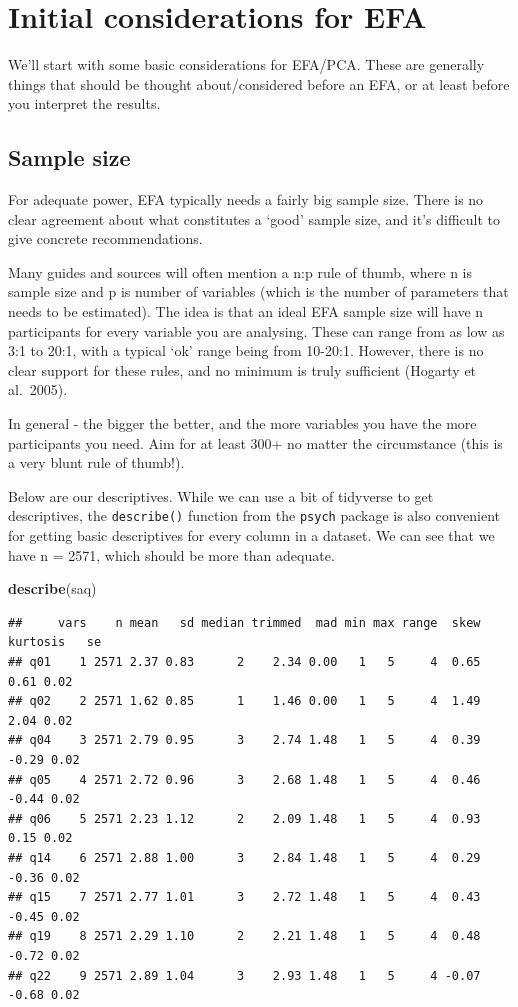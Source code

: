 \documentclass[
]{book}
\newenvironment{Shaded}{\begin{snugshade}}{\end{snugshade}}
\newcommand{\FunctionTok}[1]{\textcolor[rgb]{0.13,0.29,0.53}{\textbf{#1}}}
\newcommand{\NormalTok}[1]{#1}
\begin{document}
\section{Initial considerations for EFA}\label{initial-considerations-for-efa}

We'll start with some basic considerations for EFA/PCA. These are generally things that should be thought about/considered before an EFA, or at least before you interpret the results.

\subsection{Sample size}\label{sample-size}

For adequate power, EFA typically needs a fairly big sample size. There is no clear agreement about what constitutes a `good' sample size, and it's difficult to give concrete recommendations.

Many guides and sources will often mention a n:p rule of thumb, where n is sample size and p is number of variables (which is the number of parameters that needs to be estimated). The idea is that an ideal EFA sample size will have n participants for every variable you are analysing. These can range from as low as 3:1 to 20:1, with a typical `ok' range being from 10-20:1. However, there is no clear support for these rules, and no minimum is truly sufficient (Hogarty et al.~2005).

In general - the bigger the better, and the more variables you have the more participants you need. Aim for at least 300+ no matter the circumstance (this is a very blunt rule of thumb!).

Below are our descriptives. While we can use a bit of tidyverse to get descriptives, the \texttt{describe()} function from the \texttt{psych} package is also convenient for getting basic descriptives for every column in a dataset. We can see that we have n = 2571, which should be more than adequate.

\begin{Shaded}
\begin{Highlighting}[]
\FunctionTok{describe}\NormalTok{(saq)}
\end{Highlighting}
\end{Shaded}

\begin{verbatim}
##     vars    n mean   sd median trimmed  mad min max range  skew kurtosis   se
## q01    1 2571 2.37 0.83      2    2.34 0.00   1   5     4  0.65     0.61 0.02
## q02    2 2571 1.62 0.85      1    1.46 0.00   1   5     4  1.49     2.04 0.02
## q04    3 2571 2.79 0.95      3    2.74 1.48   1   5     4  0.39    -0.29 0.02
## q05    4 2571 2.72 0.96      3    2.68 1.48   1   5     4  0.46    -0.44 0.02
## q06    5 2571 2.23 1.12      2    2.09 1.48   1   5     4  0.93     0.15 0.02
## q14    6 2571 2.88 1.00      3    2.84 1.48   1   5     4  0.29    -0.36 0.02
## q15    7 2571 2.77 1.01      3    2.72 1.48   1   5     4  0.43    -0.45 0.02
## q19    8 2571 2.29 1.10      2    2.21 1.48   1   5     4  0.48    -0.72 0.02
## q22    9 2571 2.89 1.04      3    2.93 1.48   1   5     4 -0.07    -0.68 0.02
\end{verbatim}
\end{document}
